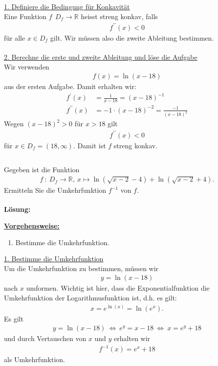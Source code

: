 \underline{1. Definiere die Bedingung für Konkavität}\\
Eine Funktion $ f \: \ D_f \to \mathbb{R} $ heisst streng konkav, falls
\begin{align*}
f^{\prime \prime}(x) < 0
\end{align*}
für alle $ x \in D_f $ gilt. Wir müssen also die zweite Ableitung bestimmen.
\\
\\
\underline{2. Berechne die erste und zweite Ableitung und löse die Aufgabe}\\
Wir verwenden 
\begin{align*}
f(x) = \ln(x - 18)
\end{align*}
aus der ersten Aufgabe.
Damit erhalten wir:
\begin{align*}
f^\prime(x) &=  \frac{1}{x -18} = (x-18)^{-1}  \\
f^{\prime \prime}(x) &= -1 \cdot (x-18)^{-2} = \frac{-1}{(x-18)^2}
\end{align*}
Wegen $ (x-18)^2  > 0 $ für $ x > 18 $ gilt
\begin{align*}
f^{\prime \prime}(x) < 0 
\end{align*}
für $ x \in D_f = (18,\infty) $.
Damit ist $ f $ streng konkav.
\newpage
\subsection*{}
Gegeben ist die Funktion 
\begin{align*}
f  \ : \ D_f \to \mathbb{R},
\
x \mapsto \ln(\sqrt{x-2} - 4 ) + \ln(\sqrt{x-2} + 4).
\end{align*}
Ermitteln Sie die Umkehrfunktion $ f^{-1} $ von $ f $.
\\
\\
\textbf{Lösung:}
\begin{mdframed}
\underline{\textbf{Vorgehensweise:}}
\begin{enumerate}
\item Bestimme die Umkehrfunktion.
\end{enumerate}
\end{mdframed}

\underline{1. Bestimme die Umkehrfunktion}\\
Um die Umkehrfunktion zu bestimmen, müssen wir
\begin{align*}
y = \ln(x-18)
\end{align*}
nach $ x $ umformen. 
Wichtig ist hier, dass die Exponentialfunktion die Umkehrfunktion der Logarithmusfunktion ist, d.h. es gilt:
\begin{align*}
x = e^ {\ln(x)} = \ln(e^x).
\end{align*}
Es gilt
\begin{align*}
y = \ln(x - 18)
\ 
\Leftrightarrow
\
e^y = x - 18
\
\Leftrightarrow
\
x = e^y + 18
\end{align*}
und durch Vertauschen von $ x  $ und $ y $ erhalten wir
\begin{align*}
f^{-1}(x ) = e^x + 18
\end{align*}
als Umkehrfunktion.

